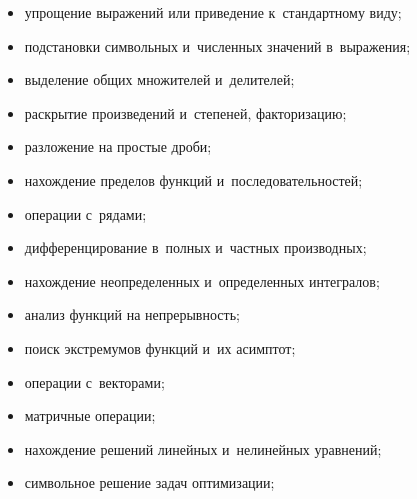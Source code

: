 \begin{itemize}

\item     упрощение выражений или приведение к~стандартному виду;



\item     подстановки символьных и~численных значений в~выражения;



\item    выделение общих множителей и~делителей;



\item     раскрытие произведений и~степеней, факторизацию;



\item     разложение на простые дроби;



\item     нахождение пределов функций и~последовательностей;



\item     операции с~рядами;



\item     дифференцирование в~полных и~частных производных;



\item    нахождение неопределенных и~определенных интегралов;



\item    анализ функций на непрерывность;



\item     поиск экстремумов функций и~их асимптот;



\item    операции с~векторами;



\item    матричные операции;



\item    нахождение решений линейных и~нелинейных уравнений;



\item    символьное решение задач оптимизации;




\end{itemize}
